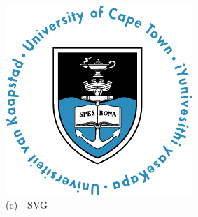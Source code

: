 \hfill
\begin{minipage}[b]{0.3\textwidth}\centering\setlength{\parindent}{0mm}
\includegraphics[width=\textwidth]{3_Chapters/5_Chapter_Results/Figures/UCT.pdf}\\%
{\small (c)~~SVG}%
\end{minipage}
\hfill\mbox{}

